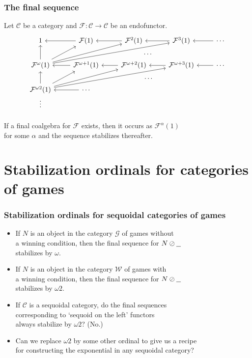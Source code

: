 \documentclass{beamer}
\newcommand*\from{\colon}
\newcommand{\cmap}[3]{#1\from{}#2\to{}#3}
\newcommand{\sequoid}{\oslash}
\newcommand{\G}{\mathcal G}
\newcommand{\C}{\mathcal C}
\newcommand{\F}{\mathcal F}
\newcommand{\nsb}{N\sequoid\underline{\hspace{1.5ex}}\;}
\begin{document}
\begin{frame}[fragile]
  \frametitle{The final sequence}
  Let $\C$ be a category and $\cmap{\F}{\C}{\C}$ be an endofunctor.
  \[
    \begin{tikzcd}
      1
        & \F(1) \arrow[l]
          & \F^2(1) \arrow[l]
            & \F^3(1) \arrow[l]
              & \cdots \arrow[l] \\
      \F^\omega(1) \arrow[u] \arrow[ur] \arrow[urr] \arrow [urrr] \arrow[urrrr, phantom, xshift=5.0ex, yshift=-0.5ex, "\cdots"]
        & \F^{\omega+1}(1) \arrow[l]
          & \F^{\omega+2}(1) \arrow[l]
            & \F^{\omega+3}(1) \arrow[l]
              & \cdots \arrow[l] \\
      \F^{\omega2}(1) \arrow[u] \arrow[ur] \arrow[urr] \arrow [urrr] \arrow[urrrr, phantom, xshift=5.0ex, yshift=-0.5ex, "\cdots"]
        & \cdots \arrow[l]
          &
            & \\
      \arrow[u, phantom, "\vdots"]
    \end{tikzcd}
    \]

  If a final coalgebra for $\F$ exists, then it occurs as $\F^\alpha(1)$ \\
  for some $\alpha$ and the sequence stabilizes thereafter.
\end{frame}

\section{Stabilization ordinals for categories of games}

\begin{frame}
  \frametitle{Stabilization ordinals for sequoidal categories of games}

  \begin{itemize}
    \item If $N$ is an object in the category $\G$ of games without \\
      a winning condition, then the final sequence for $\nsb$ \\
      stabilizes by $\omega$.
      \pause
    \item If $N$ is an object in the category $\mathcal W$ of games with \\
      a winning condition, then the final sequence for $\nsb$ \\
      stabilizes by $\omega2$.
      \pause
    \item If $\C$ is a sequoidal category, do the final sequences \\
      corresponding to `sequoid on the left' functors \\
      always stabilize by $\omega2$?  (No.)
      \pause
    \item Can we replace $\omega2$ by some other ordinal to give us a recipe \\
      for constructing the exponential in any sequoidal category?
  \end{itemize}
\end{frame}
\end{document}
